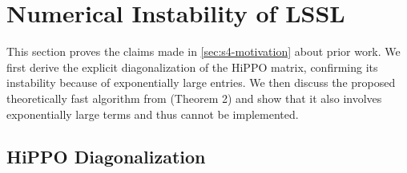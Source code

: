 \section{Numerical Instability of LSSL}
\label{sec:lssl-instability}


This section proves the claims made in \cref{sec:s4-motivation} about prior work.
We first derive the explicit diagonalization of the HiPPO matrix, confirming its instability because of exponentially large entries.
We then discuss the proposed theoretically fast algorithm from \citep{gu2021lssl} (Theorem 2) and show that it also involves exponentially large terms and thus cannot be implemented.

\subsection{HiPPO Diagonalization}

